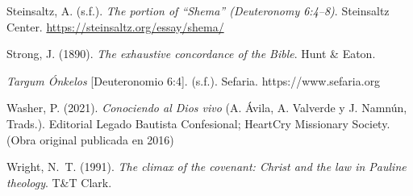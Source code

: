 \documentclass[11pt,letterpaper]{article}
\newcommand{\refapa}[1]{\par{\RaggedRight\hangindent=1.27cm\hangafter=1\noindent #1\par}\vspace{4pt}}
\begin{document}
\refapa{Steinsaltz, A. (s.f.). \emph{The portion of ``Shema'' (Deuteronomy 6:4--8)}. Steinsaltz Center. \url{https://steinsaltz.org/essay/shema/}}
\refapa{Strong, J. (1890). \emph{The exhaustive concordance of the Bible}. Hunt \& Eaton.}
\refapa{\emph{Targum Ónkelos} [Deuteronomio 6:4]. (s.f.). Sefaria. https://www.sefaria.org}
\refapa{Washer, P. (2021). \emph{Conociendo al Dios vivo} (A. Ávila, A. Valverde y J. Namnún, Trads.). Editorial Legado Bautista Confesional; HeartCry Missionary Society. (Obra original publicada en 2016)}
\refapa{Wright, N.~T. (1991). \emph{The climax of the covenant: Christ and the law in Pauline theology}. T\&T Clark.}
\end{document}
